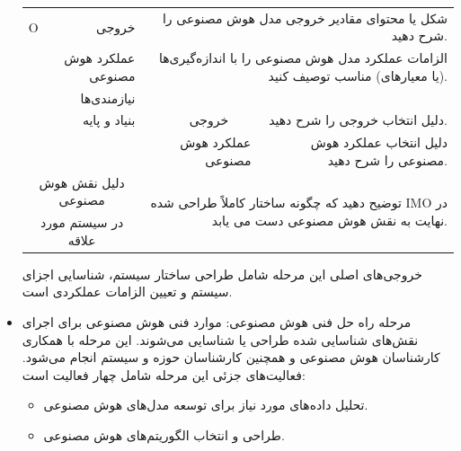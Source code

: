 \documentclass[a4paper,10pt]{article}
\begin{document}
\begin{itemize}
\begin{table}[htbp]
\begin{tabularx}{\textwidth}{c c c c X}
                            \multicolumn{1}{c}{O} & \multicolumn{1}{r}{خروجی} & \multicolumn{3}{r}{شکل یا محتوای مقادیر خروجی مدل هوش مصنوعی را شرح دهید.} \\
                            & \multicolumn{1}{r}{عملکرد هوش مصنوعی} & \multicolumn{3}{r}{الزامات عملکرد مدل هوش مصنوعی را با اندازه‌گیری‌ها (یا معیارهای) مناسب توصیف کنید.} \\
                            & \multicolumn{1}{r}{نیازمندی‌ها} &  &  &  \\
                            & \multicolumn{1}{r}{بنیاد و پایه} & \multicolumn{1}{r}{خروجی} &  & \multicolumn{1}{r}{دلیل انتخاب خروجی را شرح دهید.} \\
                            &  & \multicolumn{2}{r}{عملکرد هوش مصنوعی} & \multicolumn{1}{r}{دلیل انتخاب عملکرد هوش مصنوعی را شرح دهید.} \\
                            
                            \multicolumn{2}{c}{دلیل نقش هوش مصنوعی} & \multicolumn{3}{r}{\multirow{2}{*}{توضیح دهید که چگونه ساختار کاملاً طراحی شده IMO در نهایت به نقش هوش مصنوعی دست می یابد.}} \\
                            \multicolumn{2}{c}{در سیستم مورد علاقه} & \\

                            \hline

                        \end{tabularx}
                        
                    \end{table}

                    خروجی‌های اصلی این مرحله شامل طراحی ساختار سیستم، شناسایی اجزای سیستم و تعیین الزامات عملکردی است.

                    \item مرحله راه حل فنی هوش مصنوعی: موارد فنی هوش مصنوعی برای اجرای نقش‌های شناسایی شده طراحی یا شناسایی می‌شوند. این مرحله با همکاری کارشناسان هوش مصنوعی و همچنین کارشناسان حوزه و سیستم انجام می‌شود. فعالیت‌های جزئی این مرحله شامل چهار فعالیت است:

                    \begin{itemize}
                        
                        \item تحلیل داده‌های مورد نیاز برای توسعه مدل‌های هوش مصنوعی.

                        \item طراحی و انتخاب الگوریتم‌های هوش مصنوعی.


\end{itemize}
\end{itemize}
\end{document}
